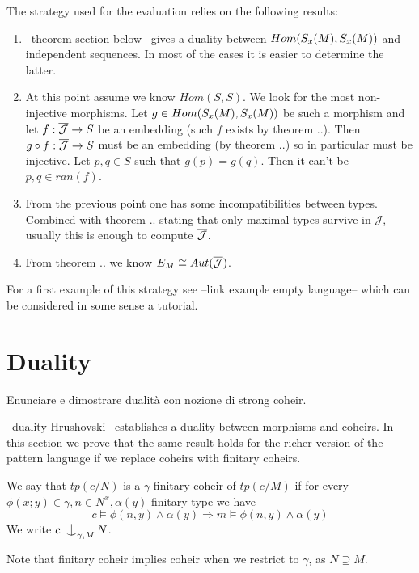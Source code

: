 \documentclass[../main.tex]{subfiles}
\begin{document}
The strategy used for the evaluation relies on the following results:
\begin{enumerate}
	\item	--theorem section below-- gives a duality between $Hom(S_x(M),S_x(M))$ and independent sequences. 
		In most of the cases it is easier to determine the latter.
	\item	At this point assume we know $Hom(S,S)$. We look for the most non-injective morphisms.
		Let $g \in Hom(S_x(M),S_x(M))$ be such a morphism and let $f: \mathcal{\mathcal{\overline{J}}} \to S$ be an embedding (such $f$ exists by theorem ..).
		Then $g \circ f: \mathcal{\overline{J}} \to S$ must be an embedding (by theorem ..) so in particular must be injective.
		Let $p,q \in S$ such that $g(p) = g(q)$. Then it can't be $p,q \in ran(f)$.
	\item	From the previous point one has some incompatibilities between types.
		Combined with theorem .. stating that only maximal types survive in $\mathcal{J}$, usually this is enough to compute $\mathcal{\overline{J}}$.
	\item	From theorem .. we know $E_M \cong Aut(\mathcal{\overline{J}})$.
\end{enumerate}

For a first example of this strategy see --link example empty language-- which can be considered in some sense a tutorial.

\section{Duality}
\label{sec:duality}

Enunciare e dimostrare dualità con nozione di strong coheir.


--duality Hrushovski-- establishes a duality between morphisms and coheirs.
In this section we prove that the same result holds for the richer version of the pattern language if we replace coheirs with finitary coheirs.

\begin{definition}
	We say that $tp(c/N)$ is a $\gamma$-finitary coheir of $tp(c/M)$ if for every $\phi(x;y) \in \gamma, n \in N^x, \alpha(y)$ finitary type we have
	\[
		c \models \phi(n,y) \land \alpha(y) \Rightarrow m \models \phi(n,y) \land \alpha(y) 
	\]
	We write $c \nonfork_{\gamma, M} N$.
\end{definition}

Note that finitary coheir implies coheir when we restrict to $\gamma$, as $N \supseteq M$.
\end{document}
